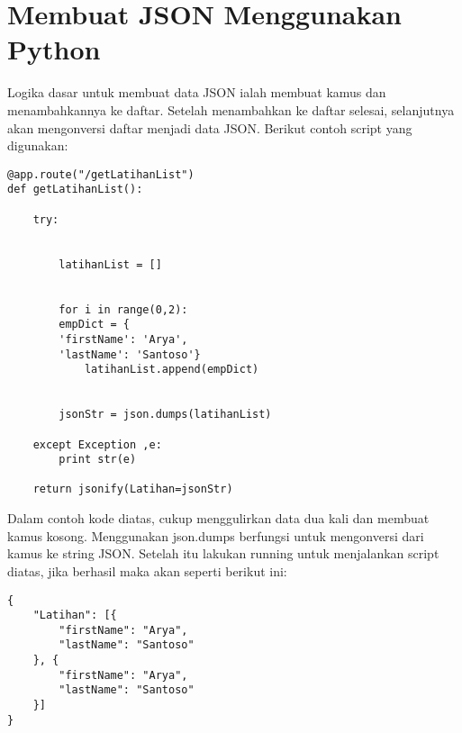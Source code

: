 \section{Membuat JSON Menggunakan Python}
Logika dasar untuk membuat data JSON ialah membuat kamus dan menambahkannya ke daftar. Setelah menambahkan ke daftar selesai, selanjutnya akan mengonversi daftar menjadi data JSON. Berikut contoh script yang digunakan:
\begin{verbatim}
@app.route("/getLatihanList")
def getLatihanList():

    try:


        latihanList = []


        for i in range(0,2):
        empDict = {
        'firstName': 'Arya',
        'lastName': 'Santoso'}
            latihanList.append(empDict)


        jsonStr = json.dumps(latihanList)

    except Exception ,e:
        print str(e)

    return jsonify(Latihan=jsonStr)
\end{verbatim}
Dalam contoh kode diatas, cukup menggulirkan data dua kali dan membuat kamus kosong. Menggunakan json.dumps berfungsi untuk mengonversi dari kamus ke string JSON. Setelah itu lakukan running untuk menjalankan script diatas, jika berhasil maka akan seperti berikut ini:
\begin{verbatim}
{
    "Latihan": [{
        "firstName": "Arya",
        "lastName": "Santoso"
    }, {
        "firstName": "Arya",
        "lastName": "Santoso"
    }]
}
\end{verbatim}


